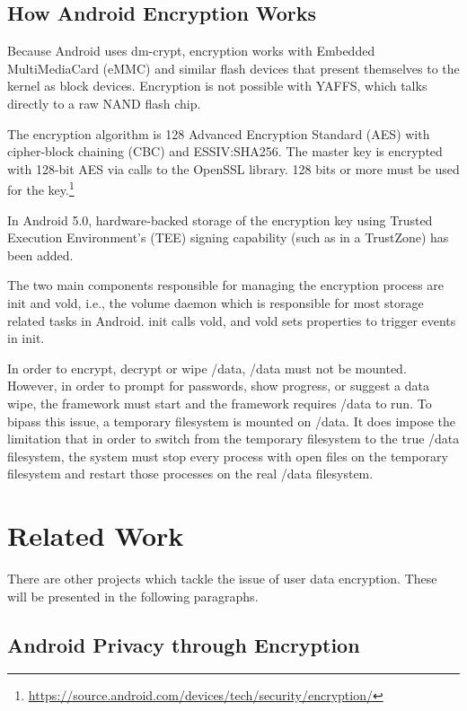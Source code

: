 \subsection{How Android Encryption Works}
\label{sub-sec:and-enc-works}

Because Android uses dm-crypt, encryption works with Embedded MultiMediaCard (eMMC) and similar flash devices that present themselves to the kernel as block devices. Encryption is not possible with YAFFS, which talks directly to a raw NAND flash chip.

The encryption algorithm is 128 Advanced Encryption Standard (AES) with cipher-block chaining (CBC) and ESSIV:SHA256. The master key is encrypted with 128-bit AES via calls to the OpenSSL library. 128 bits or more must be used for the key.\footnote{\url{https://source.android.com/devices/tech/security/encryption/}}

In Android 5.0, hardware-backed storage of the encryption key using Trusted Execution Environment’s (TEE) signing capability (such as in a TrustZone) has been added.

The two main components responsible for managing the encryption process are init and vold, i.e., the volume daemon which is responsible for most storage related tasks in Android. init calls vold, and vold sets properties to trigger events in init.

In order to encrypt, decrypt or wipe /data, /data must not be mounted. However, in order to prompt for passwords, show progress, or suggest a data wipe, the framework must start and the framework requires /data to run. To bipass this issue, a temporary filesystem is mounted on /data. It does impose the limitation that in order to switch from the temporary filesystem to the true /data filesystem, the system must stop every process with open files on the temporary filesystem and restart those processes on the real /data filesystem.

\section{Related Work}
\label{sec:related-work}

There are other projects which tackle the issue of user data encryption. These will be presented in the following paragraphs.

\subsection{Android Privacy through Encryption}
\label{sub-sec:and-priv-defreez}

